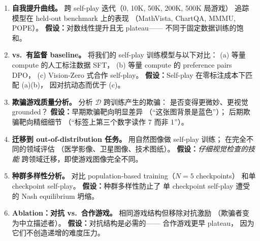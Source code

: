 \documentclass[12pt,a4paper]{article}
\begin{document}
\begin{expbox}
\begin{enumerate}[leftmargin=1.5em]
  \item \textbf{自我提升曲线。}
    跨 self-play 迭代（0, 10K, 50K, 200K, 500K 局游戏）
    追踪模型在 held-out benchmark 上的表现
    （MathVista, ChartQA, MMMU, POPE）。
    \textbf{假设：}对数线性提升且无 plateau——
    不同于固定数据训练的饱和。

  \item \textbf{vs.\ 有监督 baseline。}
    将我们的 self-play 训练模型与以下对比：
    (a) 等量 compute 的人工标注数据 SFT，
    (b) 等量 compute 的 preference pairs DPO，
    (c) Vision-Zero 式合作 self-play。
    \textbf{假设：}Self-play 在零标注成本下匹配 (a)(b)，
    因对抗动态而优于 (c)。

  \item \textbf{欺骗游戏质量分析。}
    分析 $\mathcal{D}$ 跨训练产生的欺骗：
    是否变得更微妙、更视觉 grounded？
    \textbf{假设：}早期欺骗靶向明显差异
    （``这张图背景是蓝色''）；
    后期欺骗靶向精细细节
    （``标签上第三个数字读作 7 而非 1''）。

  \item \textbf{迁移到 out-of-distribution 任务。}
    用自然图像做 self-play 训练；
    在完全不同的领域评估
    （医学影像、卫星图像、技术图纸）。
    \textbf{假设：}\textit{仔细视觉检查的技能}
    跨领域迁移，即使游戏图像完全不同。

  \item \textbf{种群多样性分析。}
    对比 population-based training（$N = 5$ checkpoints）
    和单 checkpoint self-play。
    \textbf{假设：}种群多样性防止了
    单 checkpoint self-play 遭受的 Nash equilibrium 坍缩。

  \item \textbf{Ablation：对抗 vs.\ 合作游戏。}
    相同游戏结构但移除对抗激励
    （欺骗者变为中立描述者）。
    \textbf{假设：}对抗结构是必需的——
    合作游戏更早 plateau，
    因为它们不创造递增的难度压力。
\end{enumerate}
\end{expbox}
\end{document}
